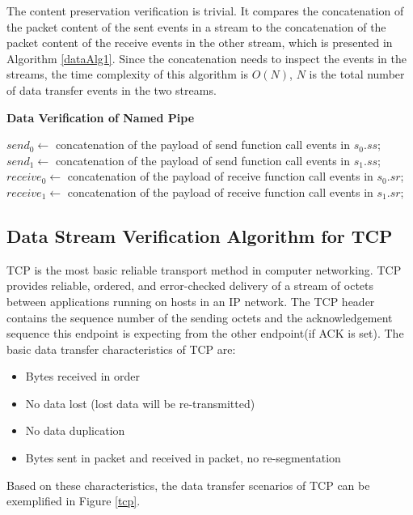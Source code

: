 The content preservation verification is trivial. It compares the concatenation of the packet content of the sent events in a stream to the concatenation of the packet content of the receive events in the other stream, which is presented in Algorithm \ref{dataAlg1}. Since the concatenation needs to inspect the events in the streams, the time complexity of this algorithm is $O(N)$, $N$ is the total number of data transfer events in the two streams.

\begin{algorithm}[H]
\DontPrintSemicolon
\caption{{\bf Data Verification of Named Pipe} \label{dataAlg1}}
\;
$send_0 \leftarrow$ concatenation of the payload of send function call events in $s_0.ss$;\;
$send_1 \leftarrow$ concatenation of the payload of send function call events in $s_1.ss$;\;
$receive_0 \leftarrow$ concatenation of the payload of receive function call events in $s_0.sr$;\;
$receive_1 \leftarrow$ concatenation of the payload of receive function call events in $s_1.sr$;\;
\end{algorithm} 

\subsection{Data Stream Verification Algorithm for TCP}
TCP is the most basic reliable transport method in computer networking. TCP provides reliable, ordered, and error-checked delivery of a stream of octets between applications running on hosts in an IP network. The TCP header contains the sequence number of the sending octets and the acknowledgement sequence this endpoint is expecting from the other endpoint(if ACK is set). The basic data transfer characteristics of TCP are:
\begin{itemize}
  \item Bytes received in order
  \item No data lost (lost data will be re-transmitted)
  \item No data duplication
  \item Bytes sent in packet and received in packet, no re-segmentation
\end{itemize}

Based on these characteristics,  the data transfer scenarios of TCP can be exemplified in Figure \ref{tcp}.

